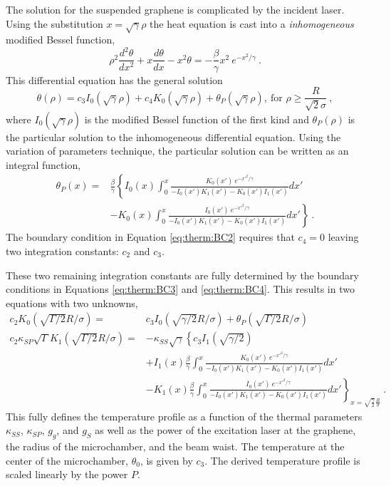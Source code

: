 The solution for the suspended graphene is complicated by the incident laser.
Using the substitution $x=\sqrt{\gamma} \rho$ the heat equation is cast into a \emph{inhomogeneous} modified Bessel function,
\begin{equation*}
	\rho^2 \frac{d^2 \theta}{d x^2}+x \frac{d \theta}{dx}-x^2 \theta = -\frac{\beta}{\gamma}x^2 \ e^{-x^2/\gamma} \ .
\end{equation*}
This differential equation has the general solution
\begin{equation*}
	\theta(\rho)=c_3 I_0(\sqrt{\gamma}\rho) + c_4 K_0(\sqrt{\gamma}\rho) + \theta_P(\sqrt{\gamma} \rho) , \ \textrm{for } \rho \geq \frac{R}{\sqrt{2} \sigma} \ ,
\end{equation*}
where $I_0 (\sqrt{\gamma} \rho)$ is the modified Bessel function of the first kind and $\theta_P (\rho)$ is the particular solution to the inhomogeneous differential equation.
Using the variation of parameters technique, the particular solution can be written as an integral function, 
\begin{align*}
	\theta_P (x)=&\frac{\beta}{\gamma} \left \{
	I_0 (x) \int_0^{x} 
		\frac{K_0(x') \ e^{-x'^2/\gamma} }{-I_0(x') K_1 (x')-K_0(x') I_1 (x')} dx' \right. \\
	&\left.-K_0 (x) \int_0^{x}
		\frac{I_0(x') \ e^{-x'^2/\gamma} }{-I_0(x') K_1 (x')-K_0(x') I_1 (x')} dx'
	\right \} \ .
\end{align*}
The boundary condition in Equation \ref{eq:therm:BC2} requires that $c_4=0$ leaving two integration constants: $c_2$ and $c_3$.

These two remaining integration constants are fully determined by the boundary conditions in Equations \ref{eq:therm:BC3} and \ref{eq:therm:BC4}.
This results in two equations with two unknowns,
\begin{align}
	c_2 K_0(\sqrt{\Gamma/2} R/\sigma)=&c_3 I_0(\sqrt{\gamma/2} R/\sigma)+\theta_P (\sqrt{\Gamma/2} R/\sigma) 
	\nonumber \\
	c_2 \kappa_{SP} \sqrt{\Gamma} K_1 (\sqrt{\Gamma/2} R/\sigma) =&
		-\kappa_{SS} \sqrt{\gamma} \left \{c_3 I_1(\sqrt{\gamma/2} ) \right. \nonumber \\
		&+I_1(x) \frac{\beta}{\gamma} \int_0^{x} 
			\frac{K_0(x') \ e^{-x'^2/\gamma} }{-I_0(x') K_1 (x')-K_0(x') I_1 (x')} dx' \nonumber \\
		&\left.-K_1(x) \frac{\beta}{\gamma} \int_0^{x}
			\frac{I_0(x') \ e^{-x'^2/\gamma} }{-I_0(x') K_1 (x')-K_0(x') I_1 (x')} dx' 	
		\right \}_{x=\sqrt{\frac{\gamma}{2}} \frac{R}{\sigma}} \ . \label{eq:HTM:c3}
\end{align}
This fully defines the temperature profile as a function of the thermal parameters $\kappa_{SS}$, $\kappa_{SP}$, $g_g$, and $g_S$ as well as the power of the excitation laser at the graphene, the radius of the microchamber, and the beam waist.
The temperature at the center of the microchamber, $\theta_0$, is given by $c_3$.
The derived temperature profile is scaled linearly by the power $P$.


